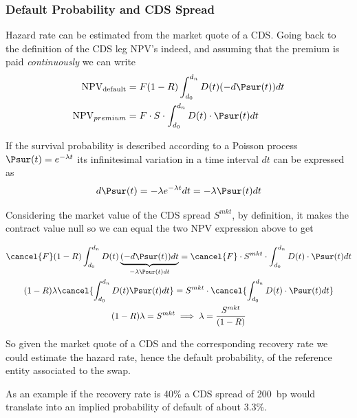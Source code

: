 \subsubsection*{Default Probability and CDS Spread}

Hazard rate can be estimated from the market quote of a CDS. Going back to the definition of the CDS leg NPV's indeed, and assuming that the premium is paid \emph{continuously} we can write
\begin{equation}
  \begin{aligned}
    \mathrm{NPV_{default}} &= F(1-R) \int_{d_0}^{d_n} D(t) (-d\Psur(t)) dt \\
    \textrm{NPV}_{premium} &= F\cdot S \cdot \int_{d_0}^{d_n} D(t) \cdot \Psur(t) dt 
  \end{aligned}
\end{equation}

If the survival probability is described according to a Poisson process $\Psur(t) = e^{-\lambda t}$ its infinitesimal variation in a time interval $dt$ can be expressed as
\begin{equation*}
  d\Psur(t) = -\lambda e^{-\lambda t} dt = -\lambda \Psur(t) dt 
\end{equation*}

Considering the market value of the CDS spread $S^{mkt}$, by definition, it makes the contract value null so we can equal the two NPV expression above to get

\begin{equation*}
  \begin{gathered}
    \cancel{F}(1-R) \int_{d_0}^{d_n} D(t) \underbrace{(-d\Psur(t)) dt}_{-\lambda  \Psur(t) dt} =  \cancel{F}\cdot S^{mkt} \cdot \int_{d_0}^{d_n} D(t) \cdot \Psur(t) dt \\
    (1-R) \lambda \cancel{\int_{d_0}^{d_n} D(t) \Psur(t) dt} =  S^{mkt} \cdot \cancel{\int_{d_0}^{d_n} D(t) \cdot \Psur(t) dt} \\
    (1-R) \lambda = S^{mkt} \implies  \lambda = \frac{ S^{mkt}}{(1-R)}
  \end{gathered}
\end{equation*}

So given the market quote of a CDS and the corresponding recovery rate we could estimate the hazard rate, hence the default probability, of the reference entity associated to the swap.

As an example if the recovery rate is 40\% a CDS spread of 200~bp would translate into an implied probability of default of about 3.3\%.

